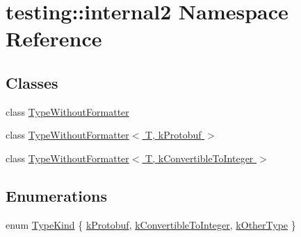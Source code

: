 \hypertarget{namespacetesting_1_1internal2}{\section{testing\-:\-:internal2 Namespace Reference}
\label{namespacetesting_1_1internal2}
}
\subsection*{Classes}
\begin{DoxyCompactItemize}
\item 
class \hyperlink{classtesting_1_1internal2_1_1TypeWithoutFormatter}{Type\-Without\-Formatter}
\item 
class \hyperlink{classtesting_1_1internal2_1_1TypeWithoutFormatter_3_01T_00_01kProtobuf_01_4}{Type\-Without\-Formatter$<$ T, k\-Protobuf $>$}
\item 
class \hyperlink{classtesting_1_1internal2_1_1TypeWithoutFormatter_3_01T_00_01kConvertibleToInteger_01_4}{Type\-Without\-Formatter$<$ T, k\-Convertible\-To\-Integer $>$}
\end{DoxyCompactItemize}
\subsection*{Enumerations}
\begin{DoxyCompactItemize}
\item 
enum \hyperlink{namespacetesting_1_1internal2_aeb8161b0b3ee503347b0662d7028fd57}{Type\-Kind} \{ \hyperlink{namespacetesting_1_1internal2_aeb8161b0b3ee503347b0662d7028fd57a14aaf98a2547ecf43eef0868d54b1383}{k\-Protobuf}, 
\hyperlink{namespacetesting_1_1internal2_aeb8161b0b3ee503347b0662d7028fd57a9bdcf3f1548f498b2b7f097306ea0224}{k\-Convertible\-To\-Integer}, 
\hyperlink{namespacetesting_1_1internal2_aeb8161b0b3ee503347b0662d7028fd57abe8aaea44751d6ebd0cdf5bd94451db1}{k\-Other\-Type}
 \}
\end{DoxyCompactItemize}
